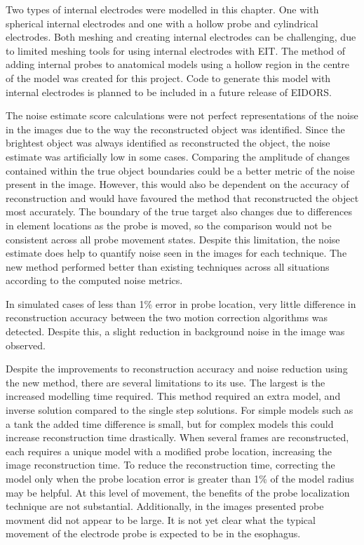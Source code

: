 Two types of internal electrodes were modelled in this chapter. One with
spherical internal electrodes and one with a hollow probe and cylindrical electrodes. 
Both meshing and creating internal electrodes can be challenging, due to limited meshing tools 
for using internal electrodes with EIT. The method of adding internal probes to
anatomical models using a hollow region in the centre of the model was created for this 
project. Code to generate this model with internal electrodes is planned to be included in a
future release of EIDORS.

The noise estimate score calculations were not perfect representations of the noise
in the images due to the way the reconstructed object was identified.  Since the
brightest object was always identified as reconstructed the object, the noise estimate was
artificially low in some cases. 
Comparing the amplitude of changes contained within the true
object boundaries could be a better metric of the noise present in the image. 
However, this
would also be dependent on the accuracy of reconstruction and would have favoured
the method that reconstructed the object most accurately.
The boundary of the true target
also changes due to differences in element locations as the 
probe is moved, so the comparison would not be consistent across all probe movement
states. Despite this limitation, the noise estimate does help to quantify 
noise seen in the images for each technique. 
The new
method performed better than existing techniques across all situations according to the computed
noise metrics.

In simulated cases of less than 1\% error in probe location, very little 
difference in reconstruction accuracy between 
the two motion correction algorithms was detected. 
Despite this, a slight reduction 
in background noise in the image was observed. 

Despite the improvements to reconstruction accuracy 
and noise reduction using the new method, there are several limitations to its use. 
The largest is 
the increased modelling time required. This method required an extra model, and inverse 
solution compared to the single step solutions. For simple models such as 
a tank the added time difference
is small, but for complex models this could increase reconstruction time drastically. 
When several frames are reconstructed, each requires a unique model 
with a modified probe location, increasing the image reconstruction time. 
To reduce the reconstruction 
time, correcting the model only when the  probe location error is greater than 1\%
of the model radius may be helpful. At this 
level of movement, the benefits of 
the probe localization technique are 
not substantial. 
Additionally, in the images presented probe movment did not 
appear to be large. It is not yet clear what the typical movement of the electrode probe 
is expected to be in the esophagus. 


